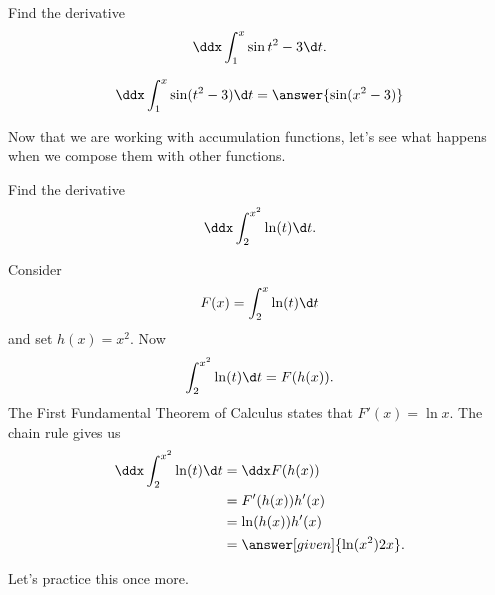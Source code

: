 \documentclass{ximera}
\begin{document}
\begin{question}
  Find the derivative 
  \[
 \ddx \int_1^{x} \sin{t^2-3} \d t.
  \]
  \begin{prompt}
	\[    \ddx \int_1^{x} \sin(t^2-3) \d t = \answer{\sin(x^2-3)} \]
  \end{prompt}
\end{question}

Now that we are working with accumulation functions, let's see what happens when we compose them with other functions.

\begin{example}
  Find the derivative 
  \[
 \ddx \int_2^{x^2} \ln(t) \d t.
  \]
  \begin{explanation}
    Consider 
    \[
    F(x) = \int_2^x \ln(t) \d t
    \]
    and set $h(x) = x^2$. Now
    \[
    \int_2^{x^2} \ln(t) \d t = F(h(x)).
    \]
    The First Fundamental Theorem of Calculus states that $F'(x) = \ln
    x$. The chain rule gives us
    \begin{align*}
       \ddx \int_2^{x^2} \ln(t) \d t&= \ddx F(h(x)) \\
       &= F' (h(x))h'(x) \\
      &= \ln (h(x)) h'(x) \\
      &= \answer[given]{\ln(x^2) 2x}.
    \end{align*}
  \end{explanation}
\end{example}

Let's practice this once more.
\end{document}
